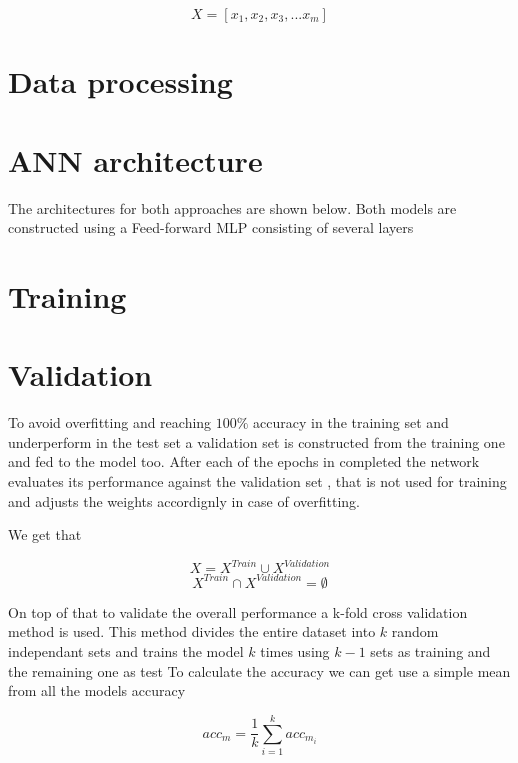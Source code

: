 $$X = [x_1, x_2, x_3, ... x_m]$$


\section{Data processing}


\section{ANN architecture}
The architectures for both approaches are shown below. 
Both models are constructed using a Feed-forward MLP consisting of several layers

\section{Training}


\section{Validation}
To avoid overfitting and reaching $100\%$ accuracy in the training set and underperform in the test set a validation set is constructed from the training one and fed to the model too.
After each of the epochs in completed the network evaluates its performance against the validation set , that is not used for training and adjusts the weights accordignly in case of overfitting.

We get that

$$X = X^{Train} \cup X^{Validation}$$
$$X^{Train} \cap X^{Validation} =  \emptyset $$

On top of that to validate the overall performance a k-fold cross validation method is used.
This method divides the entire dataset into $k$ random independant sets and trains the model $k$ times using $k - 1$ sets as training and the remaining one as test
To calculate the accuracy we can get use a simple mean from all the models accuracy

$$acc_{m} = \frac{1}{k}\sum_{i=1}^{k} acc_{m_{i}}$$


